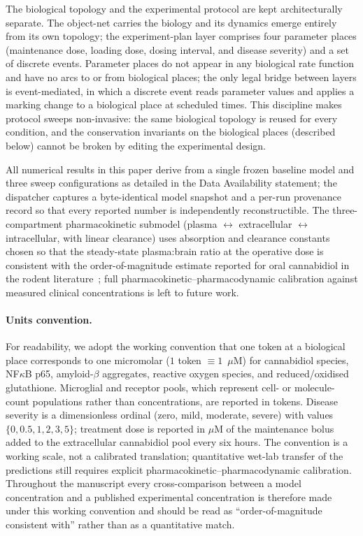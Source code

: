 \documentclass[10pt,letterpaper]{article}
\begin{document}
The biological topology and the experimental protocol are kept architecturally separate. The object-net carries the biology and its dynamics emerge entirely from its own topology; the experiment-plan layer comprises four parameter places (maintenance dose, loading dose, dosing interval, and disease severity) and a set of discrete events. Parameter places do not appear in any biological rate function and have no arcs to or from biological places; the only legal bridge between layers is event-mediated, in which a discrete event reads parameter values and applies a marking change to a biological place at scheduled times. This discipline makes protocol sweeps non-invasive: the same biological topology is reused for every condition, and the conservation invariants on the biological places (described below) cannot be broken by editing the experimental design.

All numerical results in this paper derive from a single frozen baseline model and three sweep configurations as detailed in the Data Availability statement; the dispatcher captures a byte-identical model snapshot and a per-run provenance record so that every reported number is independently reconstructible. The three-compartment pharmacokinetic submodel (plasma $\leftrightarrow$ extracellular $\leftrightarrow$ intracellular, with linear clearance) uses absorption and clearance constants chosen so that the steady-state plasma:brain ratio at the operative dose is consistent with the order-of-magnitude estimate reported for oral cannabidiol in the rodent literature~\cite{zgair2016,millar2018}; full pharmacokinetic--pharmacodynamic calibration against measured clinical concentrations is left to future work.

\paragraph{Units convention.} For readability, we adopt the working convention that one token at a biological place corresponds to one micromolar ($1$ token $\equiv 1$~$\mu$M) for cannabidiol species, NF$\kappa$B p65, amyloid-$\beta$ aggregates, reactive oxygen species, and reduced/oxidised glutathione. Microglial and receptor pools, which represent cell- or molecule-count populations rather than concentrations, are reported in tokens. Disease severity is a dimensionless ordinal (zero, mild, moderate, severe) with values $\{0, 0.5, 1, 2, 3, 5\}$; treatment dose is reported in $\mu$M of the maintenance bolus added to the extracellular cannabidiol pool every six hours. The convention is a working scale, not a calibrated translation; quantitative wet-lab transfer of the predictions still requires explicit pharmacokinetic--pharmacodynamic calibration. Throughout the manuscript every cross-comparison between a model concentration and a published experimental concentration is therefore made under this working convention and should be read as ``order-of-magnitude consistent with'' rather than as a quantitative match.
\end{document}
